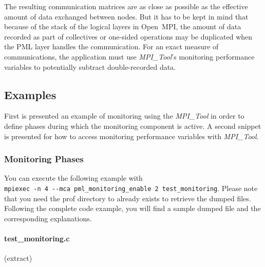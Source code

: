 \documentclass[notitlepage]{article}
\newcommand{\mpit}[1]{\textit{MPI\_Tool#1}}
\newcommand{\ompi}[0]{Open~MPI}
\begin{document}
The resulting communication matrices are as close as possible as the
effective amount of data exchanged between nodes. But it has to be
kept in mind that because of the stack of the logical layers in
\ompi{}, the amount of data recorded as part of collectives or
one-sided operations may be duplicated when the PML layer handles the
communication. For an exact measure of communications, the application
must use \mpit{}'s monitoring performance variables to potentially
subtract double-recorded data.

\subsection{Examples}

First is presented an example of monitoring using the \mpit{} in order
to define phases during which the monitoring component is active. A
second snippet is presented for how to access monitoring performance
variables with \mpit{}.

\subsubsection{Monitoring Phases}

You can execute the following example with
\\ \verb|mpiexec -n 4 --mca pml_monitoring_enable 2 test_monitoring|. Please
note that you need the prof directory to already exists to retrieve
the dumped files. Following the complete code example, you will find a
sample dumped file and the corresponding explanations.

\paragraph{test\_monitoring.c} (extract)
\end{document}

